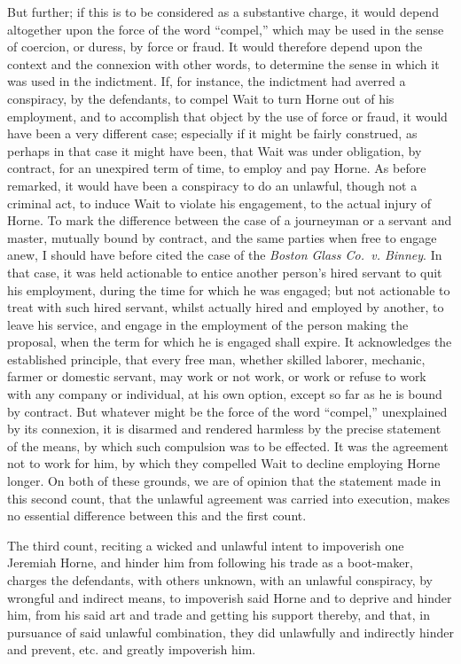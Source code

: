 \documentclass[
  letterpaper,
  11pt,
  DIV=9,
  openright]{scrbook}
\begin{document}
But further; if this is to be considered as a substantive charge, it
would depend altogether upon the force of the word ``compel,'' which may
be used in the sense of coercion, or duress, by force or fraud. It would
therefore depend upon the context and the connexion with other words, to
determine the sense in which it was used in the indictment. If, for
instance, the indictment had averred a conspiracy, by the defendants, to
compel Wait to turn Horne out of his employment, and to accomplish that
object by the use of force or fraud, it would have been a very different
case; especially if it might be fairly construed, as perhaps in that
case it might have been, that Wait was under obligation, by contract,
for an unexpired term of time, to employ and pay Horne. As before
remarked, it would have been a conspiracy to do an unlawful, though not
a criminal act, to induce Wait to violate his engagement, to the actual
injury of Horne. To mark the difference between the case of a journeyman
or a servant and master, mutually bound by contract, and the same
parties when free to engage anew, I should have before cited the case of
the \emph{Boston Glass Co.~v. Binney}. In that case, it was held
actionable to entice another person's hired servant to quit his
employment, during the time for which he was engaged; but not actionable
to treat with such hired servant, whilst actually hired and employed by
another, to leave his service, and engage in the employment of the
person making the proposal, when the term for which he is engaged shall
expire. It acknowledges the established principle, that every free man,
whether skilled laborer, mechanic, farmer or domestic servant, may work
or not work, or work or refuse to work with any company or individual,
at his own option, except so far as he is bound by contract. But
whatever might be the force of the word ``compel,'' unexplained by its
connexion, it is disarmed and rendered harmless by the precise statement
of the means, by which such compulsion was to be effected. It was the
agreement not to work for him, by which they compelled Wait to decline
employing Horne longer. On both of these grounds, we are of opinion that
the statement made in this second count, that the unlawful agreement was
carried into execution, makes no essential difference between this and
the first count.

The third count, reciting a wicked and unlawful intent to impoverish one
Jeremiah Horne, and hinder him from following his trade as a boot-maker,
charges the defendants, with others unknown, with an unlawful
conspiracy, by wrongful and indirect means, to impoverish said Horne and
to deprive and hinder him, from his said art and trade and getting his
support thereby, and that, in pursuance of said unlawful combination,
they did unlawfully and indirectly hinder and prevent, etc. and greatly
impoverish him.
\end{document}

